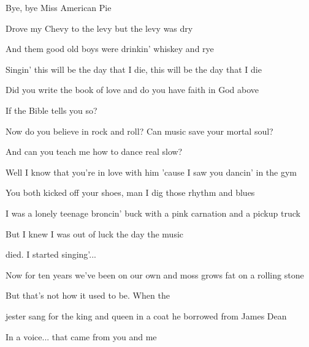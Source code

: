 \begin{song}
\begin{chorusbox}{\Chorus}
Bye, bye Miss American Pie \par
Drove my Chevy to the levy but the levy was dry \par
And them good old boys were drinkin' whiskey and rye \par
Singin' this will be the day that I die, this will be the day that I die \par
\end{chorusbox}

\bigskip

 \par
{} Did you write the book of love and do you have faith in God above \par
{} If the Bible tells you so? \par
Now do you believe in rock and roll? Can music save your mortal soul? \par
And  can you teach me  how to dance real slow? \par

\bigskip

Well I know that you're in love with him 'cause I saw you dancin' in the gym \par
You both kicked off your shoes, man I dig those rhythm and blues \par
I was a lonely teenage broncin' buck with a pink carnation and a pickup truck \par
But I knew I was out of luck the day the music \par
{}died.   I started singing'... \par

\bigskip

\Chorus \par

\bigskip

Now for ten years we've been on our own and moss grows fat on a rolling stone \par
But that's not how it used to be. When the \par
{}jester sang for the king and queen in a coat he borrowed from James Dean \par
In a voice... that came from you and me \par


\end{song}
